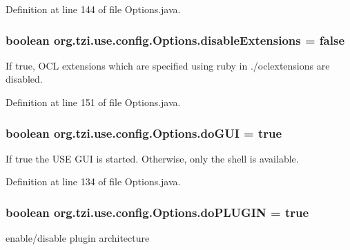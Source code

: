 Definition at line 144 of file Options.\-java.

\hypertarget{classorg_1_1tzi_1_1use_1_1config_1_1_options_ab244e4bc25c77671a1f58fe8e11c448e}{
\subsubsection[{disable\-Extensions}]{\setlength{\rightskip}{0pt plus 5cm}boolean org.\-tzi.\-use.\-config.\-Options.\-disable\-Extensions = false\hspace{0.3cm}{\ttfamily [static]}}}\label{classorg_1_1tzi_1_1use_1_1config_1_1_options_ab244e4bc25c77671a1f58fe8e11c448e}
If {\ttfamily true}, O\-C\-L extensions which are specified using ruby in ./oclextensions are disabled. 

Definition at line 151 of file Options.\-java.

\hypertarget{classorg_1_1tzi_1_1use_1_1config_1_1_options_a2c1eb84d7fa9198111606521ceb958df}{
\subsubsection[{do\-G\-U\-I}]{\setlength{\rightskip}{0pt plus 5cm}boolean org.\-tzi.\-use.\-config.\-Options.\-do\-G\-U\-I = true\hspace{0.3cm}{\ttfamily [static]}}}\label{classorg_1_1tzi_1_1use_1_1config_1_1_options_a2c1eb84d7fa9198111606521ceb958df}
If {\ttfamily true} the U\-S\-E G\-U\-I is started. Otherwise, only the shell is available. 

Definition at line 134 of file Options.\-java.

\hypertarget{classorg_1_1tzi_1_1use_1_1config_1_1_options_ab0bda39e9adf6142fb29e18fb4d277c7}{
\subsubsection[{do\-P\-L\-U\-G\-I\-N}]{\setlength{\rightskip}{0pt plus 5cm}boolean org.\-tzi.\-use.\-config.\-Options.\-do\-P\-L\-U\-G\-I\-N = true\hspace{0.3cm}{\ttfamily [static]}}}\label{classorg_1_1tzi_1_1use_1_1config_1_1_options_ab0bda39e9adf6142fb29e18fb4d277c7}
enable/disable plugin architecture 

